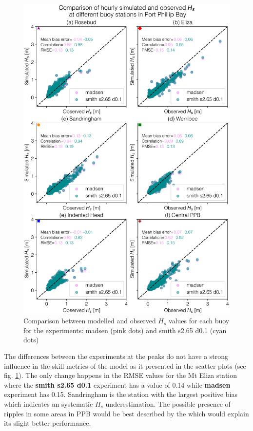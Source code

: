 \documentclass[12pt]{article}
\begin{document}
\begin{figure}[H]
    \centering
    \includegraphics[scale=0.7]{plots/scatter/madsen_vs_smith s2.65 d0.1_vert_sca.png}
    \caption{Comparison between modelled and observed $H_{s}$ values for each buoy for the experiments: madsen (pink dots) and smith s2.65 d0.1 (cyan dots) }
    \label{fig:scatter_madsen_vs_smith_def}
\end{figure}

The differences between the experiments at the peaks do not have a strong influence in the skill metrics of the model as it presented in the scatter plots (see fig. \ref{fig:scatter_madsen_vs_smith_def}). The only change happens in the RMSE values for the Mt Eliza station where the \textbf{smith s2.65 d0.1} experiment has a value of 0.14 while \textbf{madsen} experiment has 0.15. Sandringham is the station with the largest positive bias which indicates an systematic $H_s$ underestimation. The possible presence of ripples in some areas in PPB would be best described by the \textcite{Smith2011} which would explain its slight better performance.\\
\end{document}
